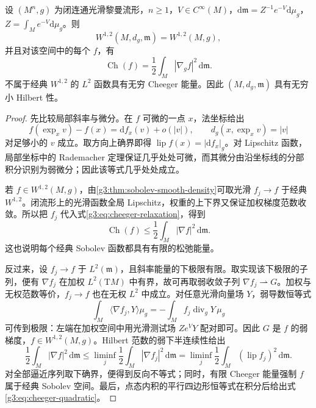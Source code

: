 \begin{theorem}\label{g3:thm:smooth-cheeger-identification}
	设 \((M^n,g)\) 为闭连通光滑黎曼流形，\(n\ge1\)，\(V\in C^\infty(M)\)，\(\mathrm d\mathfrak m=Z^{-1}e^{-V}\mathrm d\mu_g\)，\(Z=\int_Me^{-V}\mathrm d\mu_g\)。则
	\[
		W^{1,2}(M,d_g,\mathfrak m)=W^{1,2}(M,g),
	\]
	并且对该空间中的每个 \(f\)，有
	\begin{equation}\label{g3:eq:smooth-cheeger-energy}
		\operatorname{Ch}(f)=\frac12\int_M|\nabla_gf|^2\,\mathrm d\mathfrak m.
	\end{equation}
	不属于经典 \(W^{1,2}\) 的 \(L^2\) 函数具有无穷 Cheeger 能量。因此 \((M,d_g,\mathfrak m)\) 具有无穷小 Hilbert 性。
\end{theorem}
\begin{proof}
	先比较局部斜率与微分。在 \(f\) 可微的一点 \(x\)，法坐标给出
	\[
		f(\exp_xv)-f(x)=\mathrm df_x(v)+o(|v|),\qquad
		d_g(x,\exp_xv)=|v|
	\]
	对足够小的 \(v\) 成立。取方向上确界即得 \(\operatorname{lip}f(x)=|\mathrm df_x|_g\)。对 Lipschitz 函数，局部坐标中的 Rademacher 定理保证几乎处处可微，而其微分由沿坐标线的分部积分识别为弱微分；因此该等式几乎处处成立。

	若 \(f\in W^{1,2}(M,g)\)，由\cref{g3:thm:sobolev-smooth-density}可取光滑 \(f_j\to f\) 于经典 \(W^{1,2}\)。闭流形上的光滑函数全局 Lipschitz，权重的上下界又保证加权梯度范数收敛。所以把 \(f_j\) 代入式\eqref{g3:eq:cheeger-relaxation}，得到
	\[
		\operatorname{Ch}(f)\le\frac12\int_M|\nabla f|^2\,\mathrm d\mathfrak m.
	\]
	这也说明每个经典 Sobolev 函数都具有有限的松弛能量。

	反过来，设 \(f_j\to f\) 于 \(L^2(\mathfrak m)\)，且斜率能量的下极限有限。取实现该下极限的子列，便有 \(\nabla f_j\) 在加权 \(L^2(\mathrm TM)\) 中有界，故可再取弱收敛子列 \(\nabla f_j\rightharpoonup G\)。加权与无权范数等价，\(f_j\to f\) 也在无权 \(L^2\) 中成立。对任意光滑向量场 \(Y\)，弱导数恒等式
	\[
		\int_M\langle\nabla f_j,Y\rangle\mu_g
		=-\int_M f_j\operatorname{div}_gY\,\mu_g
	\]
	可传到极限：左端在加权空间中用光滑测试场 \(Ze^VY\) 配对即可。因此 \(G\) 是 \(f\) 的弱梯度，\(f\in W^{1,2}(M,g)\)。Hilbert 范数的弱下半连续性给出
	\[
		\frac12\int_M|\nabla f|^2\,\mathrm d\mathfrak m
		\le\liminf_j\frac12\int_M|\nabla f_j|^2\,\mathrm d\mathfrak m
		=\liminf_j\frac12\int_M(\operatorname{lip}f_j)^2\,\mathrm d\mathfrak m.
	\]
	对全部逼近序列取下确界，便得到反向不等式；同时，有限 Cheeger 能量强制 \(f\) 属于经典 Sobolev 空间。最后，点态内积的平行四边形恒等式在积分后给出式\eqref{g3:eq:cheeger-quadratic}。
\end{proof}

